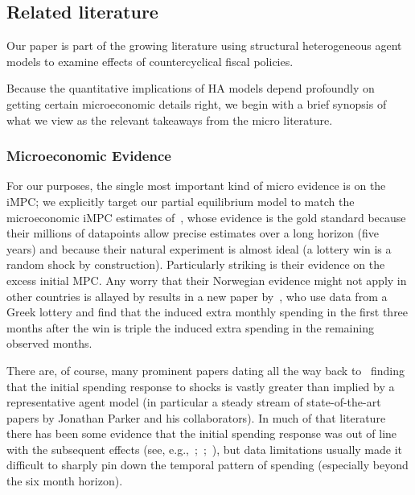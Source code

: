 \documentclass[\latexroot/\projectname]{subfiles}
\begin{document}
\whenintegrated{\label{microeconomic-literature}}\par\subsection{Related literature}
\whenintegrated{\label{sec:microlit}} 

Our paper is part of the growing literature using structural heterogeneous agent models to examine effects of countercyclical fiscal policies.

Because the quantitative implications of HA models depend profoundly on getting certain microeconomic details right, we begin with a brief synopsis of what we view as the relevant takeaways from the micro literature.

\whenintegrated{\label{microeconomic-evidence}}
\subsubsection{Microeconomic Evidence}
For our purposes, the single most important kind of micro evidence is on the iMPC; we explicitly target our partial equilibrium model to match the microeconomic iMPC estimates of~\cite{fagereng-mpc-2021}, whose evidence is the gold standard because their millions of datapoints allow precise estimates over a long horizon (five years) and because their natural experiment is almost ideal (a lottery win is a random shock by construction).  Particularly striking is their evidence on the excess initial MPC.  Any worry that their Norwegian evidence might not apply in other countries is allayed by results in a new paper by~\cite{kotsogiannisMPCs}, who use data from a Greek lottery and find that the induced extra monthly spending in the first three months after the win is triple the induced extra spending in the remaining observed months.

There are, of course, many prominent papers dating all the way back to~\cite{friedmanWindfalls} finding that the initial spending response to shocks is vastly greater than implied by a representative agent model (in particular a steady stream of state-of-the-art papers by Jonathan Parker and his collaborators). In much of that literature there has been some evidence that the initial spending response was out of line with the subsequent effects (see, e.g.,~\cite{parker2013consumer};~\cite{broda2014economic};~\cite{jpsTax}), but data limitations usually made it difficult to sharply pin down the temporal pattern of spending (especially beyond the six month horizon).
\end{document}
